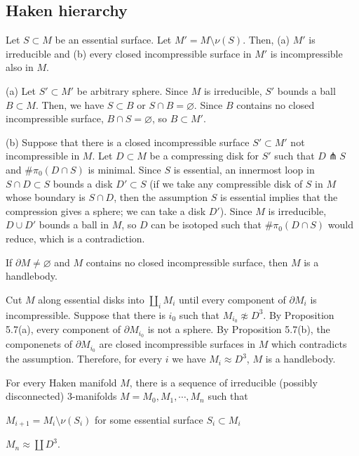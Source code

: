 \documentclass{../../small}
\begin{document}
\subsection{Haken hierarchy}

\begin{prop}
Let $S\subset M$ be an essential surface.
Let $M'=M\setminus\nu(S)$.
Then, (a) $M'$ is irreducible and (b) every closed incompressible surface in $M'$ is incompressible also in $M$.
\end{prop}
\begin{pf}
(a)
Let $S'\subset M'$ be arbitrary sphere.
Since $M$ is irreducible, $S'$ bounds a ball $B\subset M$.
Then, we have $S\subset B$ or $S\cap B=\varnothing$.
Since $B$ contains no closed incompressible surface, $B\cap S=\varnothing$, so $B\subset M'$.

(b)
Suppose that there is a closed incompressible surface $S'\subset M'$ not incompressible in $M$.
Let $D\subset M$ be a compressing disk for $S'$ such that $D\pitchfork S$ and $\#\pi_0(D\cap S)$ is minimal.
Since $S$ is essential, an innermost loop in $S\cap D\subset S$ bounds a disk $D'\subset S$ (if we take any compressible disk of $S$ in $M$ whose boundary is $S\cap D$, then the assumption $S$ is essential implies that the compression gives a sphere; we can take a disk $D'$).
Since $M$ is irreducible, $D\cup D'$ bounds a ball in $M$, so $D$ can be isotoped such that $\#\pi_0(D\cap S)$ would reduce, which is a contradiction.
\end{pf}

\begin{prop}
If $\partial M\ne\varnothing$ and $M$ contains no closed incompressible surface, then $M$ is a handlebody.
\begin{pf}
Cut $M$ along essential disks into $\coprod_iM_i$ until every component of $\partial M_i$ is incompressible.
Suppose that there is $i_0$ such that $M_{i_0}\not\approx D^3$.
By Proposition 5.7(a), every component of $\partial M_{i_0}$ is not a sphere.
By Proposition 5.7(b), the componenets of $\partial M_{i_0}$ are closed incompressible surfaces in $M$ which contradicts the assumption.
Therefore, for every $i$ we have $M_i\approx D^3$, $M$ is a handlebody.
\end{pf}
\end{prop}

\begin{thm}
For every Haken manifold $M$, there is a sequence of irreducible (possibly disconnected) 3-manifolds $M=M_0,M_1,\cdots,M_n$ such that
\begin{parts}
	\item $M_{i+1}=M_i\setminus\nu(S_i)$ for some essential surface $S_i\subset M_i$
	\item $M_n\approx \coprod D^3$.
\end{parts}
\end{thm}
\end{document}
